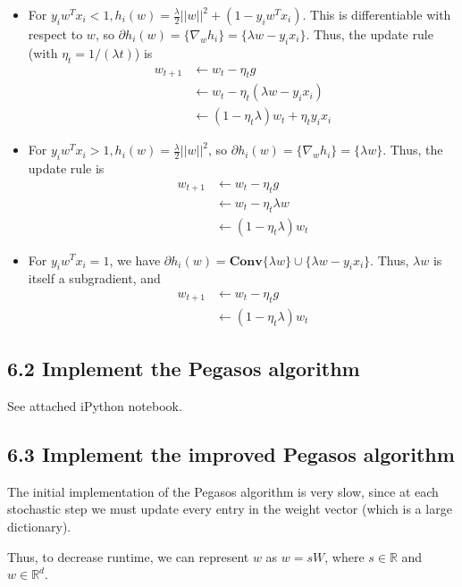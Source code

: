 \documentclass[paper=a4, fontsize=11pt]{scrartcl} %
\numberwithin{equation}{section} %
\numberwithin{figure}{section} %
\numberwithin{table}{section} %
\begin{document}
\begin{itemize}
\item For $y_i w^T x_i < 1, h_i(w) = \frac{\lambda}{2} ||w||^2 + (1 - y_i w^T x_i)$. This is differentiable with respect to $w$, so $\partial h_i(w) = \{ \nabla_w h_i\} = \{\lambda w - y_i x_i \}$. Thus, the update rule (with $\eta_t = 1 / (\lambda t)$) is
\begin{align*}
w_{t+1} &\leftarrow w_t - \eta_t g \\
	&\leftarrow w_t - \eta_t (\lambda w - y_i x_i) \\
	&\leftarrow (1 - \eta_t \lambda) w_t + \eta_t  y_i x_i
\end{align*}
\item For $y_i w^T x_i > 1, h_i(w) = \frac{\lambda}{2} ||w||^2$, so $\partial h_i(w) = \{ \nabla_w h_i\} = \{\lambda w\}$. Thus, the update rule is
\begin{align*}
w_{t+1} &\leftarrow w_t - \eta_t g \\
	&\leftarrow w_t - \eta_t \lambda w \\
	&\leftarrow (1 - \eta_t \lambda) w_t
\end{align*}
\item For $y_i w^T x_i = 1$, we have $\partial h_i(w) = \textbf{Conv} \{\lambda w\} \cup \{\lambda w - y_i x_i \}$. Thus, $\lambda w$ is itself a subgradient, and 
\begin{align*}
w_{t+1} &\leftarrow w_t - \eta_t g \\
	&\leftarrow (1 - \eta_t \lambda) w_t
\end{align*}
\end{itemize}

\subsection*{6.2 Implement the Pegasos algorithm}

See attached iPython notebook.

\subsection*{6.3 Implement the improved Pegasos algorithm}

The initial implementation of the Pegasos algorithm is very slow, since at each stochastic step we must update every entry in the weight vector (which is a large dictionary).

Thus, to decrease runtime, we can represent $w$ as $w = sW$, where $s \in \mathbb{R}$ and $w \in \mathbb{R} ^d$.
\end{document}
